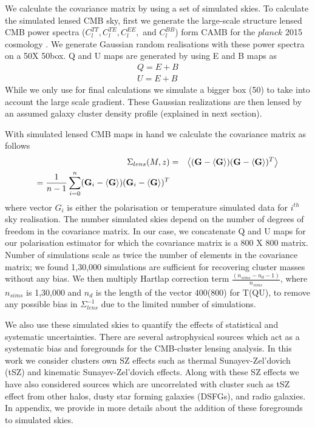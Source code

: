  We calculate the covariance matrix by using a set of simulated skies. 
 To calculate the simulated lensed CMB sky, first we generate the large-scale structure lensed CMB power spectra ($C^{TT}_{l}, C^{TE}_{l}, C^{EE}_{l},$ and $C^{BB}_{l}$) form CAMB for the $planck$ 2015 cosmology \citep{planck15_13}.  
 We generate Gaussian random realisations with these power spectra on a 50\am X 50\am box. 
 Q and U maps are generated by using E and B maps as
 \begin{eqnarray}
Q = E + B\\
U = E + B
 \end{eqnarray}
 While we only use  \smallboxsize  for final calculations we simulate a bigger box (50\am) to take into account the large scale gradient.
 These Gaussian realizations are then lensed by an assumed galaxy cluster density profile (explained in next section). 
 
 With simulated lensed CMB maps in hand we calculate the covariance matrix as follows
 \begin{eqnarray}
\Sigma_{lens}(M,z) & = & \left<(\textrm{\textbf{G}} - \left<\textrm{\textbf{G}}\right>) (\textrm{\textbf{G}} - \left<\textrm{\textbf{G}}\right>)^{T}\right>\\
  =   \frac{1}{n-1}\sum\limits_{i = 0}^{n} (\textrm{\textbf{G}}_{i} - \left<\textrm{\textbf{G}}\right>) (\textrm{\textbf{G}}_{i} - \left<\textrm{\textbf{G}}\right>)^{T} %
\label{eq_lensed_cmb_cov_mass_z}
\end{eqnarray}
 where vector $G_{i}$ is either the polarisation or temperature simulated data for $i^{th}$ sky realisation. 
 The number simulated skies depend on the number of degrees of freedom in the covariance matrix. 
 In our case, we concatenate Q and U maps for our polarisation estimator for which the covariance matrix is a 800 X 800 matrix. 
 Number of simulations scale as twice the number of elements in the covariance matrix; we found 1,30,000 simulations are sufficient for recovering cluster masses without any bias. 
  We then multiply Hartlap correction term $\frac{(n_{sims} -n_{d} -1)}{n_{sims}}$, where $n_{sims}$ is 1,30,000 and $n_{d}$ is the length of the vector 400(800) for T(QU), to remove any possible bias in $\Sigma^{-1}_{lens}$ due to the limited number of simulations. 
  
 We also use these simulated skies to quantify the effects of statistical and systematic uncertainties.
 There are several astrophysical sources which act as a systematic bias and foregrounds for the CMB-cluster lensing analysis. 
 In this work we consider clusters own SZ effects such as thermal Sunayev-Zel'dovich (tSZ) and kinematic Sunayev-Zel'dovich effects. 
 Along with these SZ effects we have also considered sources which are uncorrelated with cluster such as tSZ effect from other halos, dusty star forming galaxies (DSFGs), and radio galaxies.
 In appendix, we provide in more details about the addition of these foregrounds to simulated skies.
 
